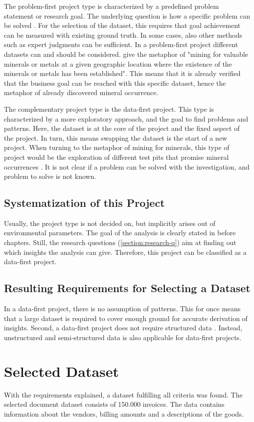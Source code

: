	The problem-first project type is characterized by a predefined problem statement or research goal. The underlying question is how a specific problem can be solved \cite{dataScienceProjectTypes}.  For the selection of the dataset, this requires that goal achievement can be measured with existing ground truth. In some cases, also other methods such as expert judgments can be sufficient. In a problem-first project different datasets can and should be considered. \cite{dataScienceProjectTypes} give the metaphor of "mining for valuable minerals or metals at a given geographic location where the existence of the minerals or metals has been established". This means that it is already verified that the business goal can be reached with this specific dataset, hence the metaphor of already discovered mineral occurrence.
	
	The complementary project type is the data-first project. This type is characterized by a more exploratory approach, and the goal to find problems and patterns. Here, the dataset is at the core of the project and the fixed aspect of the project. In turn, this means swapping the dataset is the start of a new project. When turning to the metaphor of mining for minerals, this type of project would be the exploration of different test pits that promise mineral occurrences \cite{dataScienceProjectTypes}. It is not clear if a problem can be solved with the investigation, and problem to solve is not known.
	
	\subsection{Systematization of this Project}
	Usually, the project type is not decided on, but implicitly arises out of environmental parameters. The goal of the analysis is clearly stated in before chapters. Still, the research questions (\ref{section:research-q}) aim at finding out which insights the analysis can give. Therefore, this project can be classified as a data-first project.
	
	\subsection{Resulting Requirements for Selecting a Dataset}
	In a data-first project, there is no assumption of patterns. This for once means that a large dataset is required to cover enough ground for accurate derivation of insights. Second, a data-first project does not require structured data \cite{srivastavaDataMining}. Instead, unstructured and semi-structured data is also applicable for data-first projects.
	
	
	\section{Selected Dataset}
	With the requirements explained, a dataset fulfilling all criteria was found. The selected document dataset consists of 150.000 invoices. The data contains information about the vendors, billing amounts and a descriptions of the goods. 
	
	
